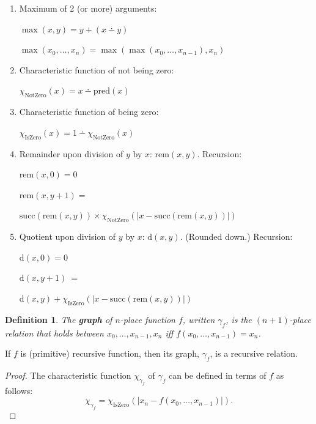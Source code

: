 \documentclass[12pt]{report}
\theoremstyle{nonumberplain}
\newtheorem{definition}{Definition}
\newtheorem{proof}{Proof}
\newcommand{\defm}[1]{\textbf{#1}\index{#1}}
\begin{document}
\begin{enumerate}[label=(\alph*)]
\item Maximum of 2 (or more) arguments:

	$\max(x, y) = y + (x \dotminus y)$

	$\max(x_0, \dotsc , x_{n}) = \max(\max(x_0,\ldots, x_{n-1}), x_{n})$

\item Characteristic function of not being zero:

$χ_{\mathrm{NotZero}}(x) = x \dotminus \mathrm{pred}(x)$

\item Characteristic function of being zero:

$χ_{\mathrm{IsZero}}(x) = 1 \dotminus χ_{\mathrm{NotZero}}(x)$

\item Remainder upon division of $y$ by $x$: $\mathrm{rem}(x, y)$.
 Recursion:

 	$\mathrm{rem}(x, 0) = 0$

	$\mathrm{rem}(x, y+1) = \phantom{x}$

$\mathrm{succ}(\mathrm{rem}(x, y)) × χ_{\mathrm{NotZero}}(\lvert x - \mathrm{succ}(\mathrm{rem}(x, y))\rvert)$

\item Quotient upon division of $y$ by $x$: $\mathrm{d}(x, y)$.
(Rounded down.) Recursion:

	$\mathrm{d}(x, 0) = 0$

	$\mathrm{d}(x, y + 1)\ =$

    \qquad $\mathrm{d}(x, y) + χ_{\mathrm{IsZero}}(\lvert x - \mathrm{succ}(\mathrm{rem}(x, y))\rvert)$
\end{enumerate}

\begin{definition}
The \defm{\emph{graph}} of $n$-place function $f$, written $\gamma_f$, is the $(n+1)$-place relation that holds between $x_0, \dotsc, x_{n-1}, x_{n}$ iff $f(x_0, \dotsc, x_{n-1}) = x_n$.
\end{definition}
\begin{mt}
If $f$ is (primitive) recursive function, then its graph, $\gamma_f$, is a recursive relation.
\end{mt}
\begin{proof}
The characteristic function $\chi_{\gamma_f}$ of $\gamma_f$ can be defined in terms of $f$ as follows:
\begin{equation*}
\chi_{\gamma_f} = \chi_{\mathrm{IsZero}}(|x_n - f(x_0, \dotsc, x_{n-1}) |).
\end{equation*}
\end{proof}
\end{document}
